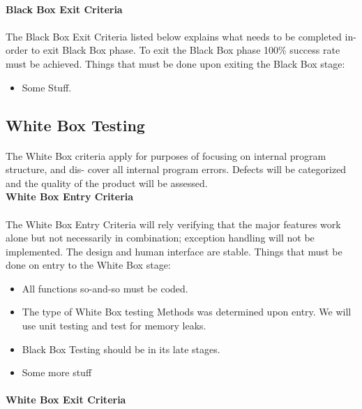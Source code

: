 \documentclass[a4paper,10pt]{scrreprt}
\begin{document}
\paragraph{}
\textbf{Black Box Exit Criteria}
\paragraph{}
The Black Box Exit Criteria listed below explains what needs to be completed in-order to exit Black Box phase. To exit the Black Box phase 100\% success rate must be achieved. Things that must be done upon exiting the Black Box stage:
\begin{itemize}
	\item Some Stuff.
\end{itemize}
\paragraph{}
\subsection{White Box Testing}
\paragraph{}
The White Box criteria apply for purposes of focusing on internal program structure, and dis- cover all internal program errors. Defects will be categorized and the quality of the product will be assessed.
\\
\textbf{White Box Entry Criteria}
\paragraph{}
The White Box Entry Criteria will rely verifying that the major features work alone but not necessarily in combination; exception handling will not be implemented. The design and human interface are stable. Things that must be done on entry to the White Box stage:
\begin{itemize}
	\item All functions so-and-so must be coded.
	\item The type of White Box testing Methods was determined upon entry. We will use unit testing and test for memory leaks.
	\item Black Box Testing should be in its late stages.
	\item Some more stuff
\end{itemize}
\paragraph{}
\textbf{White Box Exit Criteria}
\end{document}
